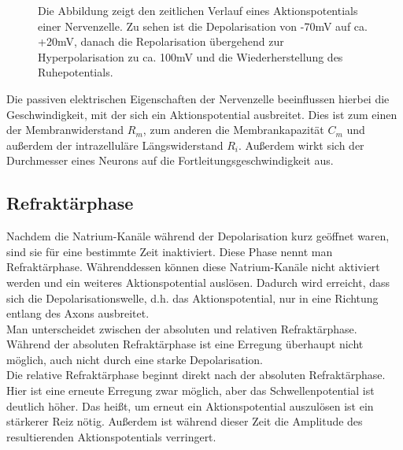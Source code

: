 \documentclass[11pt]{article}
\begin{document}
\begin{figure}[H]
\caption{Die Abbildung zeigt den zeitlichen Verlauf eines Aktionspotentials einer Nervenzelle. Zu sehen ist die Depolarisation von -70mV auf ca. +20mV, danach die Repolarisation übergehend zur Hyperpolarisation zu ca. 100mV und die Wiederherstellung des Ruhepotentials.  }
\label{ap}
\end{figure}

Die passiven elektrischen Eigenschaften der Nervenzelle beeinflussen hierbei die Geschwindigkeit, mit der sich ein Aktionspotential ausbreitet. Dies ist zum einen der Membranwiderstand $R_m$, zum anderen die Membrankapazität $C_m$ und außerdem der intrazelluläre Längswiderstand $R_i$. Außerdem wirkt sich der Durchmesser eines Neurons auf die Fortleitungsgeschwindigkeit aus.  \cite{haustiere} 

\subsection{Refraktärphase}\label{refraktär}
Nachdem die Natrium-Kanäle während der Depolarisation kurz geöffnet waren, sind sie für eine bestimmte Zeit inaktiviert. Diese Phase nennt man Refraktärphase. Währenddessen können diese Natrium-Kanäle nicht aktiviert werden und ein weiteres Aktionspotential auslösen. Dadurch wird erreicht, dass sich die Depolarisationswelle, d.h. das Aktionspotential, nur in eine Richtung entlang des Axons ausbreitet.  \cite{zellbiologie} \\
Man unterscheidet zwischen der absoluten und relativen Refraktärphase. Während der absoluten Refraktärphase ist eine Erregung überhaupt nicht möglich, auch nicht durch eine starke Depolarisation. \\
Die relative Refraktärphase beginnt direkt nach der absoluten Refraktärphase. Hier ist eine erneute Erregung zwar möglich, aber das Schwellenpotential ist deutlich höher. Das heißt, um erneut ein Aktionspotential auszulösen ist ein stärkerer Reiz nötig. Außerdem ist während dieser Zeit die Amplitude des resultierenden Aktionspotentials verringert. \cite{physiologie}
\end{document}

